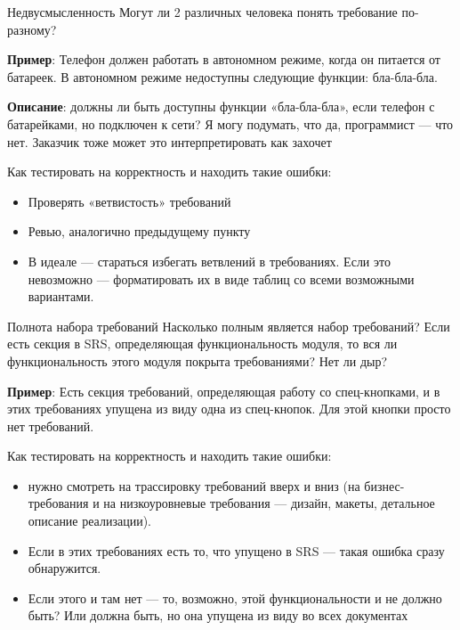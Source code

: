 \documentclass{beamer}
\begin{document}
\begin{frame}[t]{Недвусмысленность}
Могут ли 2 различных человека понять требование по-разному?

\textbf{Пример}: Телефон должен работать в автономном режиме, когда он питается от батареек. В
автономном режиме недоступны следующие функции: бла-бла-бла.

\textbf{Описание}: должны ли быть доступны функции «бла-бла-бла», если телефон с батарейками, но подключен к
сети? Я могу подумать, что да, программист — что нет. Заказчик тоже может это интерпретировать как захочет

Как тестировать на корректность и находить такие ошибки:
\begin{itemize}
\item Проверять «ветвистость» требований
\item Ревью, аналогично предыдущему пункту
\item В идеале — стараться избегать ветвлений в требованиях. Если это невозможно — форматировать их в виде
таблиц со всеми возможными вариантами.
\end{itemize}
\end{frame}

\begin{frame}[t]{Полнота набора требований}
Насколько полным является набор требований? Если есть секция в SRS, определяющая функциональность
модуля, то вся ли функциональность этого модуля покрыта требованиями? Нет ли дыр?

\textbf{Пример}: Есть секция требований, определяющая работу со спец-кнопками, и в этих
требованиях упущена из виду одна из спец-кнопок. Для этой кнопки просто нет требований.

Как тестировать на корректность и находить такие ошибки:
\begin{itemize}
\item нужно смотреть на трассировку требований вверх и вниз (на бизнес-требования и на низкоуровневые
требования — дизайн, макеты, детальное описание реализации). 
\item Если в этих требованиях есть то, что упущено в SRS — такая ошибка сразу обнаружится. 
\item Если этого и там нет — то, возможно, этой функциональности и не должно быть? Или должна быть, но она упущена из виду во всех документах
\end{itemize}
\end{frame}
\end{document}
